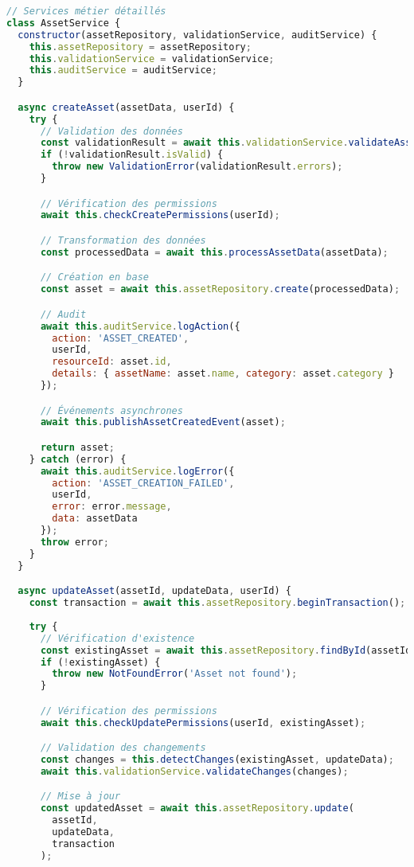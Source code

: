 \documentclass[12pt,a4paper]{report}
\begin{document}
\begin{lstlisting}[language=JavaScript, caption=Architecture backend avec DI]
// Services métier détaillés
class AssetService {
  constructor(assetRepository, validationService, auditService) {
    this.assetRepository = assetRepository;
    this.validationService = validationService;
    this.auditService = auditService;
  }

  async createAsset(assetData, userId) {
    try {
      // Validation des données
      const validationResult = await this.validationService.validateAsset(assetData);
      if (!validationResult.isValid) {
        throw new ValidationError(validationResult.errors);
      }

      // Vérification des permissions
      await this.checkCreatePermissions(userId);

      // Transformation des données
      const processedData = await this.processAssetData(assetData);

      // Création en base
      const asset = await this.assetRepository.create(processedData);

      // Audit
      await this.auditService.logAction({
        action: 'ASSET_CREATED',
        userId,
        resourceId: asset.id,
        details: { assetName: asset.name, category: asset.category }
      });

      // Événements asynchrones
      await this.publishAssetCreatedEvent(asset);

      return asset;
    } catch (error) {
      await this.auditService.logError({
        action: 'ASSET_CREATION_FAILED',
        userId,
        error: error.message,
        data: assetData
      });
      throw error;
    }
  }

  async updateAsset(assetId, updateData, userId) {
    const transaction = await this.assetRepository.beginTransaction();
    
    try {
      // Vérification d'existence
      const existingAsset = await this.assetRepository.findById(assetId);
      if (!existingAsset) {
        throw new NotFoundError('Asset not found');
      }

      // Vérification des permissions
      await this.checkUpdatePermissions(userId, existingAsset);

      // Validation des changements
      const changes = this.detectChanges(existingAsset, updateData);
      await this.validationService.validateChanges(changes);

      // Mise à jour
      const updatedAsset = await this.assetRepository.update(
        assetId, 
        updateData, 
        transaction
      );


\end{lstlisting}
\end{document}
